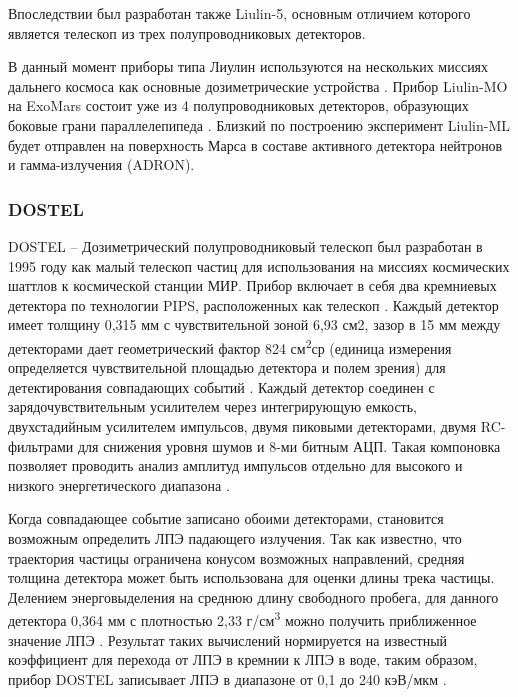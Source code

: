 Впоследствии был разработан также Liulin-5, основным отличием которого является телескоп из трех полупроводниковых детекторов.

В данный момент приборы типа Лиулин используются на нескольких миссиях дальнего космоса как основные дозиметрические устройства \cite{Dachev2015}. Прибор Liulin-MO на ExoMars состоит уже из 4 полупроводниковых детекторов, образующих  боковые грани параллелепипеда \cite{Semkova2015}. Близкий по построению эксперимент Liulin-ML будет отправлен на поверхность Марса в составе активного детектора нейтронов и гамма-излучения (ADRON).

\subsubsection{DOSTEL}

DOSTEL -- Дозиметрический полупроводниковый телескоп был разработан в 1995 году как малый телескоп частиц для использования на миссиях космических шаттлов к космической станции МИР. Прибор включает в себя два кремниевых детектора по технологии PIPS, расположенных как телескоп \cite{Beaujean2002}. Каждый детектор имеет толщину 0,315 мм с чувствительной зоной 6,93 см2, зазор в 15 мм между детекторами дает геометрический фактор 824 см\textsuperscript{2}ср (единица измерения определяется чувствительной площадью детектора и полем зрения) для детектирования совпадающих событий \cite{Beaujean2002}. Каждый детектор соединен с зарядочувствительным усилителем через интегрирующую емкость, двухстадийным усилителем импульсов, двумя пиковыми детекторами, двумя RC-фильтрами для снижения уровня шумов и 8-ми битным АЦП. Такая компоновка позволяет проводить анализ амплитуд импульсов отдельно для высокого и низкого энергетического диапазона \cite{Beaujean2002}.


Когда совпадающее событие записано обоими детекторами, становится возможным определить ЛПЭ падающего излучения. Так как известно, что траектория частицы ограничена конусом возможных направлений, средняя толщина детектора может быть использована для оценки длины трека частицы. Делением энерговыделения на среднюю длину свободного пробега, для данного детектора 0,364 мм \cite{Beaujean2002} с плотностью 2,33 г/см\textsuperscript{3}  можно получить приближенное значение ЛПЭ \cite{knoll2000radiation}. Результат таких вычислений нормируется на известный коэффициент для перехода от ЛПЭ в кремнии к ЛПЭ в воде, таким образом, прибор DOSTEL записывает ЛПЭ в диапазоне от 0,1 до 240 кэВ/мкм \cite{Beaujean2002}.

